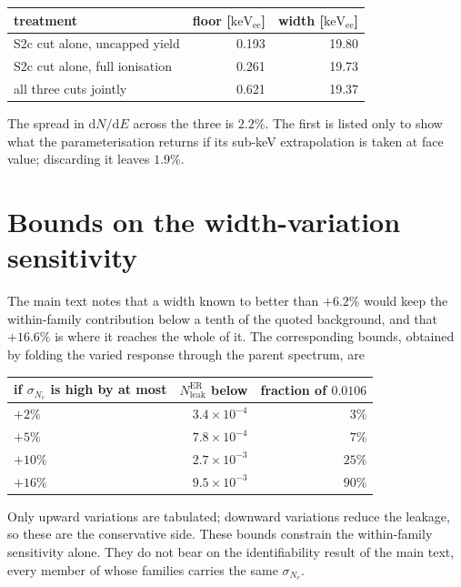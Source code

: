 \documentclass[11pt,a4paper]{article}
\newcommand{\keVee}{\ensuremath{\mathrm{keV_{ee}}}}
\begin{document}
\begin{center}
\begin{tabular}{lrr}
\toprule
treatment & floor [\keVee] & width [\keVee]\\
\midrule
S2c cut alone, uncapped yield   & 0.193 & 19.80\\
S2c cut alone, full ionisation  & 0.261 & 19.73\\
all three cuts jointly          & 0.621 & 19.37\\
\bottomrule
\end{tabular}
\end{center}

\noindent The spread in \(\mathrm{d}N/\mathrm{d}E\) across the three is
\(2.2\%\). The first is listed only to show what the parameterisation
returns if its sub-keV extrapolation is taken at face value; discarding it
leaves \(1.9\%\).

\section{Bounds on the width-variation sensitivity}
\label{sup:width}

The main text notes that a width known to better than \(+6.2\%\) would
keep the within-family contribution below a tenth of the quoted
background, and that \(+16.6\%\) is where it reaches the whole of it. The corresponding bounds, obtained by folding the varied
response through the parent spectrum, are

\begin{center}
\begin{tabular}{lrr}
\toprule
if \(\sigma_{N_e}\) is high by at most & \(N^{\mathrm{ER}}_{\mathrm{leak}}\) below & fraction of \(0.0106\)\\
\midrule
\(+2\%\)  & \(3.4\times10^{-4}\) & \(3\%\)\\
\(+5\%\)  & \(7.8\times10^{-4}\) & \(7\%\)\\
\(+10\%\) & \(2.7\times10^{-3}\) & \(25\%\)\\
\(+16\%\) & \(9.5\times10^{-3}\) & \(90\%\)\\
\bottomrule
\end{tabular}
\end{center}

\noindent Only upward variations are tabulated; downward variations reduce
the leakage, so these are the conservative side. These bounds constrain
the within-family sensitivity alone. They do not bear on the
identifiability result of the main text, every member of whose families
carries the same \(\sigma_{N_e}\).
\end{document}
